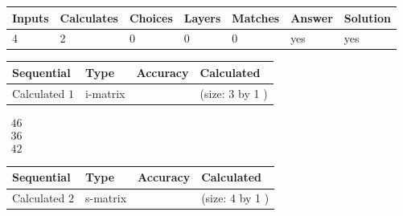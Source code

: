 \documentclass[12pt]{article}
\begin{document}
 
 
\noindent{}
 
 

 
 
 
\noindent{}
 
 

 
 
\noindent{}
 
 

 
\vspace{0.3in}
   
   
   
   
\noindent\begin{tabular}{|l|l|l|l|l|l|l|}
 \hline
Inputs & Calculates & Choices & Layers & Matches & Answer & Solution \\ \hline
           4  & 
           2  & 
           0
  & 
           0  & 
           0  & 
  yes & 
  yes 
  \\ \hline
 \end{tabular}
   
   
   
   
\noindent{}
   
   
  
  
\noindent\begin{tabular}{|l|l|l|l|}
\hline
 Sequential & Type & Accuracy & Calculated \\ 
\hline
 
 
  Calculated $            1 $ & i-matrix &  & 
 (size:            3  by            1 )
 \\  \hline  
 \end{tabular}
   
   
$\begin{array}{
 c
 }
          46  \\ 
          36  \\ 
          42
 \end{array}  $ 
  
  
\noindent\begin{tabular}{|l|l|l|l|}
\hline
 Sequential & Type & Accuracy & Calculated \\ 
\hline
 
 
  Calculated $            2 $ & s-matrix & & 
 (size:            4  by            1 )
 \\  \hline  
 \end{tabular}
   
\end{document}
